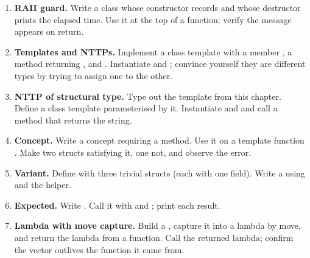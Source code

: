 \begin{enumerate}[leftmargin=*]
  \item \textbf{RAII guard.} Write a class  whose
    constructor records  and
    whose destructor prints the elapsed time. Use it at the top of
    a function; verify the message appears on return.
  \item \textbf{Templates and NTTPs.} Implement a  class template with a member , a
     method returning , and .
    Instantiate  and ; convince yourself they are different types by trying to
    assign one to the other.
  \item \textbf{NTTP of structural type.} Type out the 
    template from this chapter. Define a class template  parameterised by it. Instantiate  and
     and call a method that returns the string.
  \item \textbf{Concept.} Write a concept  requiring
    a  method. Use it on a template function
    . Make two structs satisfying it, one
    not, and observe the error.
  \item \textbf{Variant.} Define
    with three trivial structs (each with one field). Write a
     using  and the
     helper.
  \item \textbf{Expected.} Write
    .
    Call it with  and ; print each
    result.
  \item \textbf{Lambda with move capture.} Build a
    , capture it into a lambda by move, and
    return the lambda from a function. Call the returned lambda;
    confirm the vector outlives the function it came from.
\end{enumerate}
